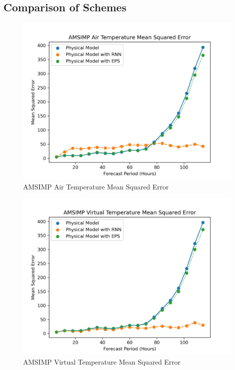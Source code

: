 \subsection{Comparison of Schemes}
\begin{figure}[H]
    \centering
    \includegraphics[width=.8\linewidth]{Graphs/accuracy/comparsion_schemes/temperature.png}
    \caption{AMSIMP Air Temperature Mean Squared Error}
\end{figure}

\begin{figure}[H]
    \centering
    \includegraphics[width=.8\linewidth]{Graphs/accuracy/comparsion_schemes/virtual_temperature.png}
    \caption{AMSIMP Virtual Temperature Mean Squared Error}
\end{figure}


